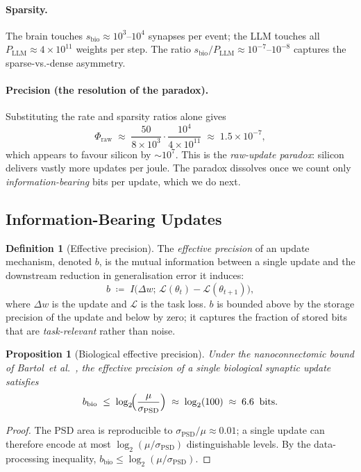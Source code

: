 \documentclass[11pt]{article}
\newtheorem{proposition}[theorem]{Proposition}
\theoremstyle{definition}
\newtheorem{definition}[theorem]{Definition}
\theoremstyle{remark}
\newcommand{\sPSD}{\sigma_{\mathrm{PSD}}}
\begin{document}
\paragraph{Sparsity.}
The brain touches $s_{\mathrm{bio}}\approx 10^{3}$--$10^{4}$ synapses per event; the LLM touches all $P_{\mathrm{LLM}}\approx 4\times 10^{11}$ weights per step.  The ratio $s_{\mathrm{bio}}/P_{\mathrm{LLM}}\approx 10^{-7}$--$10^{-8}$ captures the sparse-vs.-dense asymmetry.

\paragraph{Precision (the resolution of the paradox).}
Substituting the rate and sparsity ratios alone gives
\[
  \Phi_{\text{raw}}\;\approx\;\frac{50}{8\times 10^{3}}\cdot\frac{10^{4}}{4\times 10^{11}}\;\approx\;1.5\times 10^{-7},
\]
which appears to favour silicon by $\sim\!10^{7}$.  This is the
\emph{raw-update paradox}: silicon delivers vastly more updates per
joule.  The paradox dissolves once we count only
\emph{information-bearing} bits per update, which we do next.

\subsection{Information-Bearing Updates}
\label{sec:infoupdate}

\begin{definition}[Effective precision]
\label{def:effprec}
The \emph{effective precision} of an update mechanism, denoted $b$,
is the mutual information between a single update and the
downstream reduction in generalisation error it induces:
\[
  b \;\coloneqq\; I\!\bigl(\Delta w;\, \mathcal{L}(\theta_{t})-\mathcal{L}(\theta_{t+1})\bigr),
\]
where $\Delta w$ is the update and $\mathcal{L}$ is the task loss.
$b$ is bounded above by the storage precision of the update and
below by zero; it captures the fraction of stored bits that are
\emph{task-relevant} rather than noise.
\end{definition}

\begin{proposition}[Biological effective precision]
\label{prop:biobits}
Under the nanoconnectomic bound of Bartol~\emph{et
al.}~\cite{bartol2015nanoconnectomic}, the effective precision of a
single biological synaptic update satisfies
\[
  b_{\mathrm{bio}}\;\le\;\log_{2}\!\Bigl(\frac{\mu}{\sPSD}\Bigr)\;\approx\;\log_{2}(100)\;\approx\;6.6\;\;\text{bits}.
\]
\end{proposition}
\begin{proof}
The PSD area is reproducible to $\sPSD/\mu\approx 0.01$; a single
update can therefore encode at most $\log_{2}(\mu/\sPSD)$
distinguishable levels.  By the data-processing inequality,
$b_{\mathrm{bio}}\le \log_{2}(\mu/\sPSD)$.
\end{proof}
\end{document}
